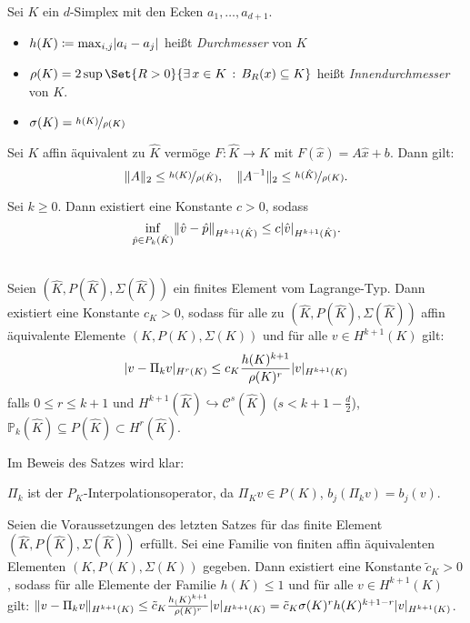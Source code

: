 \documentclass{cheat-sheet}
\newcommand{\Cont}{\mathcal{C}} %
\begin{document}

\begin{defn}
  Sei $K$ ein $d$-Simplex mit den Ecken $a_1, \ldots, a_{d+1}$.
  \begin{itemize}
    \item $h(K) \coloneqq \max_{i,j} \lvert a_i - a_j\rvert$ heißt \emph{Durchmesser} von $K$
    \item $\rho(K) = 2 \sup \Set{R > 0}{\ex{x \in K} B_R(x) \subseteq K}$ heißt \emph{Innendurchmesser} von $K$.
    \item $\sigma(K) = \nicefrac{h(K)}{\rho(K)}$
  \end{itemize}
\end{defn}

\begin{lem}
  Sei $K$ affin äquivalent zu $\hat{K}$ vermöge $F : \hat{K} \to K$ mit $F(\hat{x}) = A \hat{x} + b$.
  Dann gilt:
  \[
    \lVert A\rVert_2 \leq \nicefrac{h(K)}{\rho(\hat{K})}, \quad
    \lVert A^{-1}\rVert_2 \leq \nicefrac{h(\hat{K})}{\rho(K)}.
  \]
\end{lem}

\begin{lem}
  Sei $k \geq 0$.
  Dann existiert eine Konstante $c > 0$, sodass
  \[
    \inf_{\hat{p} \in P_k(\hat{K})} \lVert\hat{v} - \hat{p}\rVert_{H^{k+1}(\hat{K})} \leq c \lvert\hat{v}\rvert_{H^{k+1}(\hat{K})}.
  \]
\end{lem}

\begin{satz} \mbox{} \\
  Seien $(\hat{K}, P(\hat{K}), \Sigma(\hat{K}))$ ein finites Element vom Lagrange-Typ.
  Dann existiert eine Konstante $c_K > 0$, sodass für alle zu $(\hat{K}, P(\hat{K}), \Sigma (\hat{K}))$ affin äquivalente Elemente $(K, P(K), \Sigma(K))$ und für alle $v \in H^{k+1}(K)$ gilt:
  \[
    \lvert v - \Pi_k v\rvert_{H^r(K)} \leq c_K \frac{h(K)^{k+1}}{\rho(K)^r} \lvert v\rvert_{H^{k+1}(K)}
  \]
  falls $0 \leq r \leq k+1$ und $H^{k+1}(\hat{K}) \hookrightarrow \Cont^s(\hat{K})$ ($s < k+1-\tfrac{d}{2}$), $\mathbb{P}_k(\hat{K}) \subseteq P(\hat{K}) \subset H^r(\hat{K})$.
\end{satz}

Im Beweis des Satzes wird klar:

$\Pi_k$ ist der $P_K$-Interpolationsoperator, da $\Pi_K v \in P(K)$, $b_j (\Pi_k v) = b_j(v)$.

\begin{kor}
  Seien die Voraussetzungen des letzten Satzes für das finite Element $(\hat{K}, P(\hat{K}), \Sigma(\hat{K}))$ erfüllt.
  Sei eine Familie von finiten affin äquivalenten Elementen $(K, P(K), \Sigma(K))$ gegeben.
  Dann existiert eine Konstante $\tilde{c}_K > 0$, sodass für alle Elemente der Familie $h(K) \leq 1$ und für alle $v \in H^{k+1}(K)$ gilt: $\lVert v - \Pi_k v\rVert_{H^{k+1}(K)} \leq \tilde{c}_K \frac{h_(K)^{k+1}}{\rho(K)^r} \lvert v\rvert_{H^{k+1}(K)} = \tilde{c}_K \sigma(K)^r h(K)^{k+1-r} \lvert v\rvert_{H^{k+1}(K)}$.
\end{kor}
\end{document}
